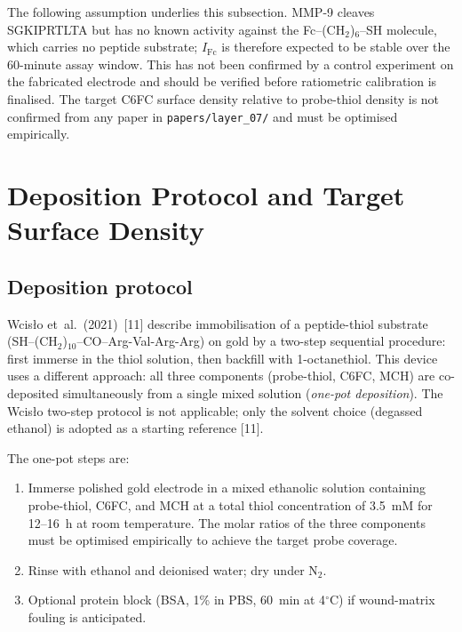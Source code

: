 \documentclass[10pt,a4paper]{article}
\numberwithin{equation}{section}
\newcommand{\cit}[1]{[#1]}   %
\begin{document}
The following assumption underlies this subsection. MMP-9 cleaves SGKIPRTLTA but has no
known activity against the Fc--(CH$_2$)$_6$--SH molecule, which carries no peptide
substrate; $I_{\text{Fc}}$ is therefore expected to be stable over the 60-minute assay
window. This has not been confirmed by a control experiment on the fabricated electrode
and should be verified before ratiometric calibration is finalised. The target C6FC
surface density relative to probe-thiol density is not confirmed from any paper in
\texttt{papers/layer\_07/} and must be optimised empirically.

\section{Deposition Protocol and Target Surface Density}
\label{sec:deposition}

\subsection{Deposition protocol}

Wcis{\l}o et~al.\ (2021)~\cit{11} describe immobilisation of a peptide-thiol substrate
(SH--(CH$_2$)$_{10}$--CO--Arg-Val-Arg-Arg) on gold by a two-step sequential procedure:
first immerse in the thiol solution, then backfill with 1-octanethiol. This device
uses a different approach: all three components (probe-thiol, C6FC, MCH) are
co-deposited simultaneously from a single mixed solution (\emph{one-pot deposition}).
The Wcis{\l}o two-step protocol is not applicable; only the solvent choice (degassed ethanol) is adopted as a starting
reference \cit{11}.

The one-pot steps are:

\begin{enumerate}[noitemsep]
  \item Immerse polished gold electrode in a mixed ethanolic solution containing
    probe-thiol, C6FC, and MCH at a total thiol concentration of 3.5~mM for
    12--16~h at room temperature. The molar ratios of the three components must be
    optimised empirically to achieve the target probe coverage.
  \item Rinse with ethanol and deionised water; dry under N$_2$.
  \item Optional protein block (BSA, 1\% in PBS, 60~min at 4$^\circ$C) if wound-matrix
    fouling is anticipated.
\end{enumerate}
\end{document}
